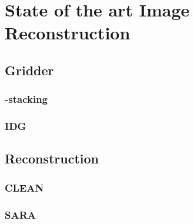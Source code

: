 \section{State of the art Image Reconstruction}

\subsection{Gridder}

\subsubsection{-stacking}

\subsubsection{IDG}


\subsection{Reconstruction}
\subsubsection{CLEAN}

\subsubsection{SARA}


















